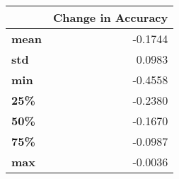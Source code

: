 \begin{tabular}{lr}
\toprule
{} &  Change in Accuracy \\
\midrule
\textbf{mean} &             -0.1744 \\
\textbf{std } &              0.0983 \\
\textbf{min } &             -0.4558 \\
\textbf{25\% } &             -0.2380 \\
\textbf{50\% } &             -0.1670 \\
\textbf{75\% } &             -0.0987 \\
\textbf{max } &             -0.0036 \\
\bottomrule
\end{tabular}

